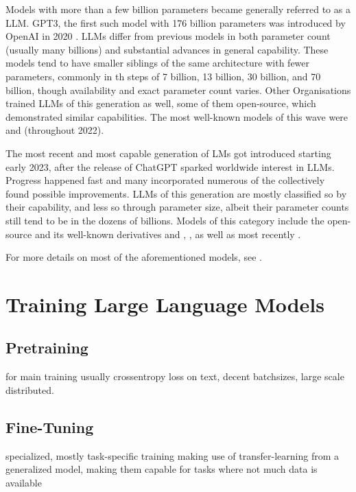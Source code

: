 Models with more than a few billion parameters became generally referred to as a \acrlong{LLM}. \gls{GPT3}, the first such model with 176 billion parameters was introduced by \gls{OpenAI} in 2020 \cite{brown_language_2020}.
\glspl{LLM} differ from previous models in both parameter count (usually many billions) and substantial advances in general capability.
These models tend to have smaller siblings of the same architecture with fewer parameters, commonly in th steps of 7 billion, 13 billion, 30 billion, and 70 billion, though availability and exact parameter count varies.
Other Organisations trained \glspl{LLM} of this generation as well, some of them open-source, which demonstrated similar capabilities.
The most well-known models of this wave were  and  (throughout 2022).

The most recent and most capable generation of \glspl{LM} got introduced starting early 2023, after the release of \gls{ChatGPT} sparked worldwide interest in \glspl{LLM}. Progress happened fast and many incorporated numerous of the collectively found possible improvements. \glspl{LLM} of this generation are mostly classified so by their capability, and less so through parameter size, albeit their parameter counts still tend to be in the dozens of billions. Models of this category include the open-source  and its well-known derivatives  and , , as well as most recently .

For more details on most of the aforementioned models, see .


\section{Training Large Language Models}\label{sec:training}

\subsection{Pretraining}\label{sub:pretraining}
for main training usually crossentropy loss on text, decent batchsizes, large scale distributed.

\subsection{Fine-Tuning}\label{sub:finetune}
specialized, mostly task-specific training making use of transfer-learning from a generalized model, making them capable for tasks where not much data is available


